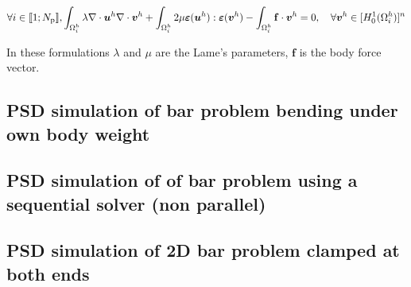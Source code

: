 \begin{equation}\label{Eq:LinearElasticity}
\forall i \in \llbracket 1; N_{\text p} \rrbracket, 
\int_{\Omega^h_i}\lambda\nabla\cdot\boldsymbol u^h\nabla\cdot\boldsymbol v^h + \int_{\Omega^h_i}2\mu\boldsymbol\varepsilon(\boldsymbol u^h):\boldsymbol\varepsilon(\boldsymbol v^h)-\int_{\Omega^h_i}\mathbf{f}\cdot\boldsymbol v^h=0, \quad\forall\boldsymbol v^h\in[H^1_0(\Omega^h_i)]^n 
\end{equation}

In these formulations $\lambda$ and $\mu$ are the Lame's parameters, $\mathbf{f}$ is the body force vector.  

\subsection{PSD simulation of bar problem bending under own body weight \label{sec:2d-bar-load}}

{
	\renewcommand{\subsection}{\subsubsection}
	
}

\subsection{PSD simulation of of bar problem using a sequential solver (non parallel) \label{sec:2d-seq-load}}

{
	\renewcommand{\subsection}{\subsubsection}
	
}



\subsection{PSD simulation of 2D bar problem clamped at both ends \label{sec:2D-bar-clamped1}}

{
	\renewcommand{\subsection}{\subsubsection}
	
}



